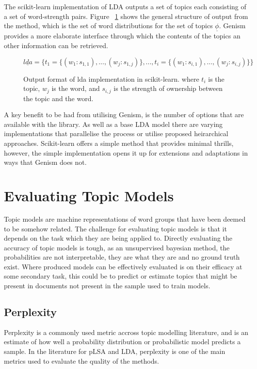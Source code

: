 \documentclass[10pt]{report}
\begin{document}
The scikit-learn implementation of LDA outputs a set of topics each consisting of a set of word-strength pairs. Figure ~\ref{fig:lda_sklearn_output} shows the general structure of output from the method, which is the set of word distributions for the set of topics $\underline\phi$. Genism provides a more elaborate interface through which the contents of the topics an other information can be retrieved. 
\begin{figure}[h!]
\[
  \underline{lda} = \{t_1 = \{(w_1 : s_{1,1}), ..., (w_j : s_{1,j})\}, ..., t_i =\{(w_1 : s_{i,1}), ..., (w_j : s_{i,j})\}\}
\]
\caption{Output format of lda implementation in scikit-learn. where \(t_i\) is the topic, \(w_j\) is the word, and \(s_{i,j}\) is the strength of ownership between the topic and the word. \label{fig:lda_sklearn_output}}
\end{figure}
A key benefit to be had from utilising Genism, is the number of options that are available with the library. As well as a base LDA model there are varying implementations that parallelise the process or utilise proposed heirarchical approaches. Scikit-learn offers a simple method that provides minimal thrills, however, the simple implementation opens it up for extensions and adaptations in ways that Genism does not.

\section{Evaluating Topic Models}
Topic models are machine representations of word groups that have been deemed to be somehow related. The challenge for evaluating topic models is that it depends on the task which they are being applied to. Directly evaluating the accuracy of topic models is tough, as an unsupervised bayesian method, the probabilities are not interpretable, they are what they are and no ground truth exist. Where produced models can be effectively evaluated is on their efficacy at some secondary task, this could be to predict or estimate topics that might be present in documents not present in the sample used to train models.


\subsection{Perplexity}
Perplexity is a commonly used metric accross topic modelling literature, and is an estimate of how well a probability distribution or probabilistic model predicts a sample. In the literature for pLSA and LDA, perplexity is one of the main metrics used to evaluate the quality of the methods.~\cite{Blei2003-dj,Hofmann1999-qb} 
\end{document}
